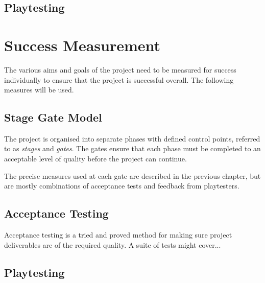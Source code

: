 \subsection{Playtesting}



\section{Success Measurement}

The various aims and goals of the project need to be measured for success individually to ensure that the project is successful overall. The following measures will be used.

\subsection{Stage Gate Model}

The project is organised into separate phases with defined control points, referred to as \emph{stages} and \emph{gates}. The gates ensure that each phase must be completed to an acceptable level of quality before the project can continue.

The precise measures used at each gate are described in the previous chapter, but are mostly combinations of acceptance tests and feedback from playtesters.

\subsection{Acceptance Testing}

Acceptance testing is a tried and proved method for making sure project deliverables are of the required quality. A suite of tests might cover...

\subsection{Playtesting}
